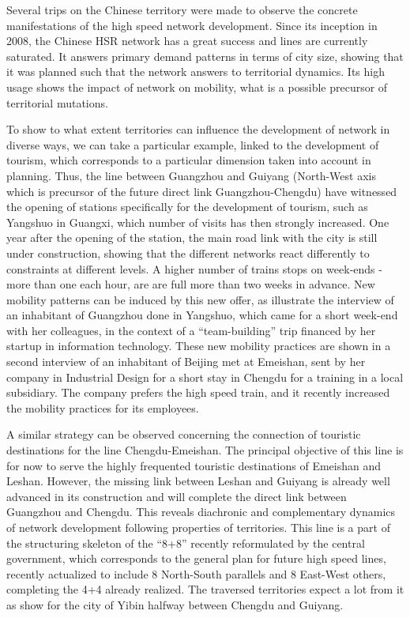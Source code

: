 
Several trips on the Chinese territory were made to observe the concrete manifestations of the high speed network development. Since its inception in 2008, the Chinese HSR network has a great success and lines are currently saturated. It answers primary demand patterns in terms of city size, showing that it was planned such that the network answers to territorial dynamics. Its high usage shows the impact of network on mobility, what is a possible precursor of territorial mutations.

To show to what extent territories can influence the development of network in diverse ways, we can take a particular example, linked to the development of tourism, which corresponds to a particular dimension taken into account in planning. Thus, the line between Guangzhou and Guiyang (North-West axis which is precursor of the future direct link Guangzhou-Chengdu) have witnessed the opening of stations specifically for the development of tourism, such as Yangshuo in Guangxi, which number of visits has then strongly increased. One year after the opening of the station, the main road link with the city is still under construction, showing that the different networks react differently to constraints at different levels. A higher number of trains stops on week-ends - more than one each hour, are are full more than two weeks in advance. New mobility patterns can be induced by this new offer, as illustrate the interview of an inhabitant of Guangzhou done in Yangshuo, which came for a short week-end with her colleagues, in the context of a ``team-building'' trip financed by her startup in information technology. These new mobility practices are shown in a second interview of an inhabitant of Beijing met at Emeishan, sent by her company in Industrial Design for a short stay in Chengdu for a training in a local subsidiary. The company prefers the high speed train, and it recently increased the mobility practices for its employees.

A similar strategy can be observed concerning the connection of touristic destinations for the line Chengdu-Emeishan. The principal objective of this line is for now to serve the highly frequented touristic destinations of Emeishan and Leshan. However, the missing link between Leshan and Guiyang is already well advanced in its construction and will complete the direct link between Guangzhou and Chengdu. This reveals diachronic and complementary dynamics of network development following properties of territories. This line is a part of the structuring skeleton of the ``8+8'' recently reformulated by the central government, which corresponds to the general plan for future high speed lines, recently actualized to include 8 North-South parallels and 8 East-West others, completing the 4+4 already realized.  The traversed territories expect a lot from it as show \cite{lu2012chengdu} for the city of Yibin halfway between Chengdu and Guiyang.

